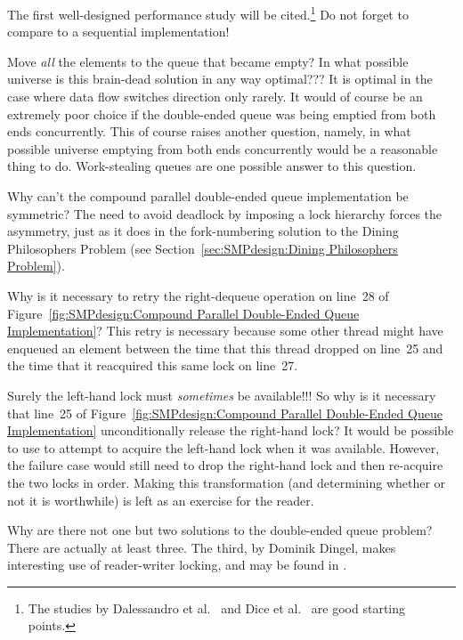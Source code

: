 	The first well-designed performance study will be cited.\footnote{
		The studies by Dalessandro
		et al.~\cite{LukeDalessandro:2011:ASPLOS:HybridNOrecSTM:deque}
		and Dice et al.~\cite{DavidDice:2010:SCA:HTM:deque} are
		good starting points.}
	Do not forget to compare to a sequential implementation!

\QuickQ{}
	Move \emph{all} the elements to the queue that became empty?
	In what possible universe is this brain-dead solution in any
	way optimal???
\QuickA{}
	It is optimal in the case where data flow switches direction only
	rarely.
	It would of course be an extremely poor choice if the double-ended
	queue was being emptied from both ends concurrently.
	This of course raises another question, namely, in what possible
	universe emptying from both ends concurrently would be a reasonable
	thing to do.
	Work-stealing queues are one possible answer to this question.

\QuickQ{}
	Why can't the compound parallel double-ended queue
	implementation be symmetric?
\QuickA{}
	The need to avoid deadlock by imposing a lock hierarchy
	forces the asymmetry, just as it does in the fork-numbering
	solution to the Dining Philosophers Problem
	(see Section~\ref{sec:SMPdesign:Dining Philosophers Problem}).

\QuickQ{}
	Why is it necessary to retry the right-dequeue operation
	on line~28 of
	Figure~\ref{fig:SMPdesign:Compound Parallel Double-Ended Queue Implementation}?
\QuickA{}
	This retry is necessary because some other thread might have
	enqueued an element between the time that this thread dropped
	 on line~25 and the time that it reacquired this
	same lock on line~27.

\QuickQ{}
	Surely the left-hand lock must \emph{sometimes} be available!!!
	So why is it necessary that line~25 of
	Figure~\ref{fig:SMPdesign:Compound Parallel Double-Ended Queue Implementation}
	unconditionally release the right-hand lock?
\QuickA{}
	It would be possible to use  to attempt
	to acquire the left-hand lock when it was available.
	However, the failure case would still need to drop the
	right-hand lock and then re-acquire the two locks in order.
	Making this transformation (and determining whether or not
	it is worthwhile) is left as an exercise for the reader.

\QuickQ{}
	Why are there not one but two solutions to the double-ended queue
	problem?
\QuickA{}
	There are actually at least three.
	The third, by Dominik Dingel, makes interesting use of
	reader-writer locking, and may be found in .

